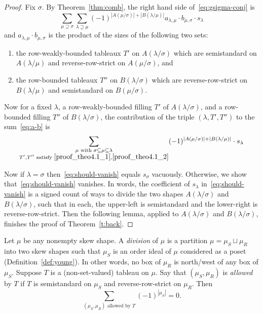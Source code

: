 \begin{proof}
Fix $\sigma$. By Theorem~\ref{thm:comb}, the right hand side of~\eqref{eq:gsigma-conj} is
\begin{equation}\label{eq:a-b}
\sum_{\mu\supseteq \sigma} \sum_{\lambda\supseteq \mu} (-1)^{|A(\mu/\sigma)|+|B(\lambda/\mu)|} a_{\lambda,\mu} \cdot b_{\mu,\sigma} \cdot s_\lambda
\end{equation}
and $a_{\lambda,\mu} \cdot b_{\mu,\sigma}$ is the product of the sizes of the following two sets:
\begin{enumerate}
\item\label{proof_theo4.1_1} the row-weakly-bounded tableaux $T'$ on $A(\lambda/\sigma)$ which are semistandard on $A(\lambda/\mu)$ and reverse-row-strict on $A(\mu/\sigma)$, and
\item\label{proof_theo4.1_2} the row-bounded tableaux $T''$ on $B(\lambda/\sigma)$ which are reverse-row-strict on $B(\lambda/\mu)$ and semistandard on $B(\mu/\sigma)$.
\end{enumerate} 

Now for a fixed $\lambda$, a row-weakly-bounded filling $T'$ of $A(\lambda/\sigma)$, and a row-bounded filling $T''$ of $B(\lambda/\sigma)$, the contribution of the triple $(\lambda,T',T'')$ to the sum~\eqref{eq:a-b} is
\begin{equation}\label{eq:should-vanish}
\sum_{\substack{\mu\text{ with } \sigma\subseteq \mu\subseteq \lambda \\T',T''\text{ satisfy }\eqref{proof_theo4.1_1},\eqref{proof_theo4.1_2}}}
 (-1)^{|A(\mu/\sigma)|+|B(\lambda/\mu)|}\cdot s_\lambda
 \end{equation}

Now if $\lambda = \sigma$ then~\eqref{eq:should-vanish} equals $s_\sigma$ vacuously. Otherwise, we show that~\eqref{eq:should-vanish} vanishes. In words, the coefficient of $s_\lambda$ in~\eqref{eq:should-vanish} is a signed count of ways to divide the two shapes $A(\lambda/\sigma)$ and $B(\lambda/\sigma)$, such that in each, the upper-left is semistandard and the lower-right is reverse-row-strict. Then the following lemma, applied to $A(\lambda/\sigma)$ and $B(\lambda/\sigma)$, finishes the proof of Theorem~\ref{t:back}. 
\end{proof}

\begin{lemma}\label{lem:ss-rrs}
Let $\mu$ be any nonempty skew shape. A \emph{division} of $\mu$ is a partition $\mu = \mu_S \sqcup \mu_R$ into two skew shapes such that $\mu_S$ is an order ideal of $\mu$ considered as a poset (Definition~\ref{def:young}). In other words, no box of $\mu_R$ is north/west of any box of $\mu_S$.
Suppose $T$ is a (non-set-valued) tableau on $\mu$. Say that $(\mu_S,\mu_R)$ is \emph{allowed} by $T$ if $T$ is semistandard on $\mu_S$ and reverse-row-strict on $\mu_R$. Then
\[
\sum_{(\mu_S,\mu_R) \text{ allowed by }T} (-1)^{|\mu_S|} = 0.
\]
\end{lemma}

